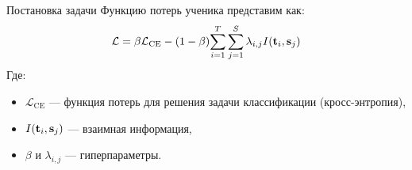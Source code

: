 \documentclass{beamer}
\begin{document}
\begin{frame}{Постановка задачи}
    Функцию потерь ученика представим как:
    $$
        \mathcal{L} = \beta \mathcal{L}_\text{CE} - (1 - \beta){\sum_{i=1}^T \sum_{j=1}^S \lambda_{i, j}I(\bold{t}_{i}, \bold{s}_{j})}
    $$
    Где:
    \begin{itemize}
        \item $\mathcal{L}_\text{CE}$ --- функция потерь для решения задачи классификации (кросс-энтропия),
        \item $I(\bold{t}_{i}, \bold{s}_{j})$ --- взаимная информация,
        \item $\beta$ и $\lambda_{i, j}$ --- гиперпараметры.
    \end{itemize}
\end{frame}

\end{document}
